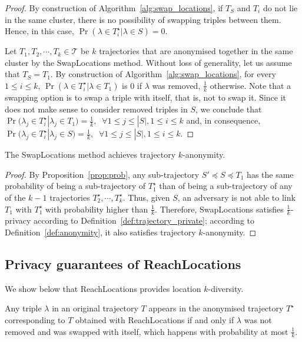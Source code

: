 \begin{proof} 
By construction of Algorithm~\ref{alg:swap_locations},
if $T_S$ and $T_i$ do not lie in the same cluster, there is no
possibility of swapping triples between them. Hence, in this
case, $\Pr(\lambda \in T_i^{\star}|\lambda \in S) = 0$.

Let $T_1, T_2, \cdots, T_k \in \mathcal{T}$ be $k$ trajectories that
are anonymised together in the same cluster by the SwapLocations method.
Without loss of generality, let us assume that $T_S = T_1$.
By construction of Algorithm~\ref{alg:swap_locations},
for every $1 \leq i \leq k$, $\Pr(\lambda \in T_i^{\star}| \lambda \in T_1)$
is $0$ if $\lambda$ was removed, $\frac{1}{k}$ otherwise.
Note that a swapping option is to swap a triple with itself,
that is, not to swap it.
Since it does not make sense to consider removed triples in $S$,
we conclude that $\Pr(\lambda_j \in T_i^{\star}| \lambda_j \in T_1) =
\frac{1}{k}, \;\; \forall 1\leq j \leq |S|, 1 \leq i \leq k$ and,
in consequence, $\Pr(\lambda_j \in T_i^{\star}| \lambda_j \in S)
= \frac{1}{k},\;\; \forall 1\leq j \leq |S|, 1 \leq i \leq k$. 
\end{proof}

\begin{theorem} \label{theo:anonymity}
The SwapLocations method achieves trajectory $k$-anonymity.
\end{theorem}

\begin{proof} 
By Proposition~\ref{prop:prob},
any sub-trajectory $S' \preceq S \preceq T_1$ has the same probability
of being a sub-trajectory of $T_1^{\star}$ than of being a sub-trajectory
of any of the $k-1$ trajectories $T_2^{\star}, \cdots, T_k^{\star}$.
Thus, given $S$, an adversary is not able to link $T_1$
with $T_1^{\star}$ with probability higher than $\frac{1}{k}$.
Therefore, SwapLocations satisfies $\frac{1}{k}$-privacy
according to Definition~\ref{def:trajectory_private}; according
to Definition~\ref{def:anonymity}, it also satisfies
trajectory $k$-anonymity.
\end{proof}

\subsection{Privacy guarantees of ReachLocations}
\label{guaranteesreach}

We show below that ReachLocations
provides location $k$-diversity.

\begin{proposition} \label{prop:reach}
Any triple $\lambda$ in an original
trajectory $T$
appears in the anonymised trajectory
$T^\star$ corresponding to $T$ obtained with ReachLocations
if and only if $\lambda$ was not removed and was swapped with itself,
which happens with probability at most $\frac{1}{k}$.
\end{proposition}

